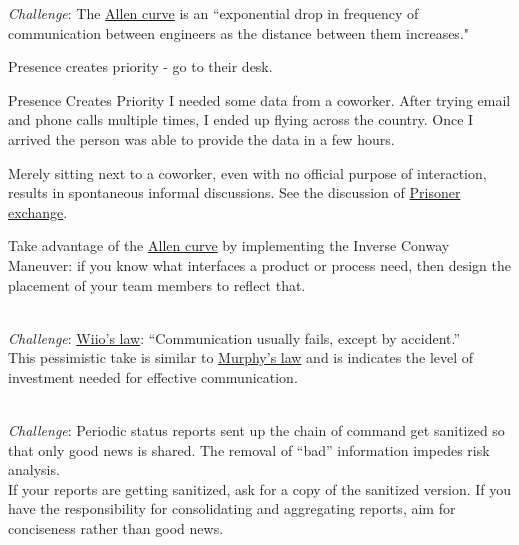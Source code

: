 \textit{Challenge}: The \href{https://en.wikipedia.org/wiki/Allen_curve}{Allen curve} 
is 
an ``exponential drop in frequency of communication between engineers as the distance between them increases."

Presence creates priority - go to their desk. 
\begin{storytime}{Presence Creates Priority}
I needed some data from a coworker. After trying email and phone calls multiple times, I ended up flying across the country. Once I arrived the person was able to provide the data in a few hours.
\end{storytime}

Merely sitting next to a coworker, even with no official purpose of interaction, results in spontaneous informal discussions. See the discussion of 
\hyperref[sec:prisoner-exchange]{Prisoner exchange}.

Take advantage of the \href{https://en.wikipedia.org/wiki/Allen_curve}{Allen curve} 
by implementing the Inverse Conway Maneuver: if you know what interfaces a product or process need, then design the placement of your team members to reflect that.

\ \\
\textit{Challenge}: \href{https://en.wikipedia.org/wiki/Wiio\%27s_laws}{Wiio's law}: 
``Communication usually fails, except by accident.''\\
This pessimistic take is similar to \href{https://en.wikipedia.org/wiki/Murphy\%27s_law}{Murphy's law}
and is indicates the level of investment needed for effective communication. 

\ \\
\textit{Challenge}: Periodic status reports sent up the chain of command get sanitized so that only good news is shared. The removal of ``bad'' information impedes risk analysis. \\
If your reports are getting sanitized, ask for a copy of the sanitized version. If you have the responsibility for consolidating and aggregating reports, aim for conciseness rather than good news. 

